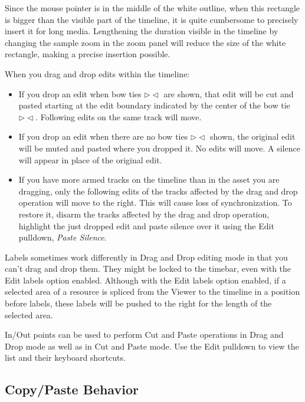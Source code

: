 Since the mouse pointer is in the middle of the white outline, when this rectangle is bigger than the visible part of the timeline, it is quite cumbersome to precisely insert it for long media. Lengthening the duration visible in the timeline by changing the sample zoom in the zoom panel will reduce the size of the white rectangle, making a precise insertion possible.

\noindent When you drag and drop edits within the timeline:

\begin{itemize}
    \item If you drop an edit when bow ties $\rhd\lhd$ are shown, that edit will be cut and pasted starting at the edit
    boundary indicated by the center of the bow tie $\rhd\lhd$.  Following edits on the same track will move.
    \item If you drop an edit when there are no bow ties $\rhd\lhd$ shown, the original edit will be muted and pasted
    where you dropped it. No edits will move. A silence will appear in place of the original edit.
    \item If you have more armed tracks on the timeline than in the asset you are dragging, only the following
    edits of the tracks affected by the drag and drop operation will move to the right. This will cause loss
    of synchronization. To restore it, disarm the tracks affected by the drag and drop operation, highlight
    the just dropped edit and paste silence over it using the Edit pulldown, \textit{Paste Silence}.
\end{itemize}

\noindent Labels sometimes work differently in Drag and Drop editing mode in that you can't drag and drop them. They might be locked to the timebar, even with the Edit labels option enabled.  Although with the Edit labels option enabled, if a selected area of a resource is spliced from the Viewer to the timeline in a position before labels, these labels will be pushed to the right for the length of the selected area.

In/Out points can be used to perform Cut and Paste operations in Drag and Drop mode as well as in Cut and Paste mode.  Use the Edit pulldown to view the list and their keyboard shortcuts.

\subsection{Copy/Paste Behavior}%
\label{sub:copy_paste_behavior}

